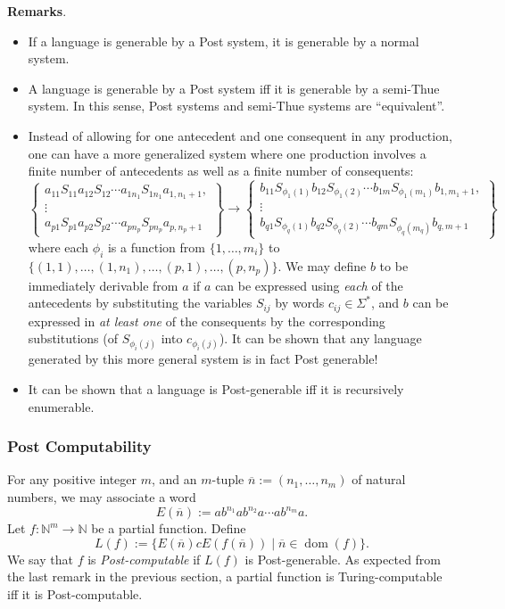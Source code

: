 \documentclass[12pt]{article}
\begin{document}
\textbf{Remarks}.
\begin{itemize}
\item If a language is generable by a Post system, it is generable by a normal system.
\item A language is generable by a Post system iff it is generable by a semi-Thue system.  In this sense, Post systems and semi-Thue systems are ``equivalent''.
\item Instead of allowing for one antecedent and one consequent in any production, one can have a more generalized system where one production involves a finite number of antecedents as well as a finite number of consequents: 
\begin{displaymath}
\left\{ \begin{array}{c}
a_{11}S_{11}a_{12}S_{12}\cdots a_{1n_1}S_{1n_1}a_{1,n_1+1}, \\ \vdots \\ 
a_{p1}S_{p1}a_{p2}S_{p2}\cdots a_{pn_p}S_{pn_p}a_{p,n_p+1} \end{array} \right\} 
\to 
\left\{ \begin{array}{c}
b_{11}S_{\phi_1(1)}b_{12}S_{\phi_1(2)}\cdots b_{1m}S_{\phi_1(m_1)}b_{1,m_1+1}, \\ \vdots \\ 
b_{q1}S_{\phi_q(1)}b_{q2}S_{\phi_q(2)}\cdots b_{qm}S_{\phi_q(m_q)}b_{q,m+1} \end{array} \right\}
\end{displaymath}
where each $\phi_i$ is a function from $\lbrace 1,\ldots,m_i\rbrace$ to $\lbrace (1,1),\ldots,(1,n_1),\ldots, (p,1),\ldots, (p,n_p)\rbrace$.  We may define $b$ to be immediately derivable from $a$ if $a$ can be expressed using  \emph{each} of the antecedents by substituting the variables $S_{ij}$ by words $c_{ij}\in \Sigma^*$, and $b$ can be expressed in \emph{at least one} of the consequents by the corresponding substitutions (of $S_{\phi_i(j)}$ into $c_{\phi_i(j)}$).  It can be shown that any language generated by this more general system is in fact Post generable!
\item It can be shown that a language is Post-generable iff it is recursively enumerable.
\end{itemize}

\subsubsection*{Post Computability}  

For any positive integer $m$, and an $m$-tuple $\overline{n}:=(n_1,\ldots,n_m)$ of natural numbers, we may associate a word $$E(\overline{n}):=ab^{n_1}ab^{n_2}a\cdots ab^{n_m}a.$$
Let $f:\mathbb{N}^m \to \mathbb{N}$ be a partial function.  Define 
$$L(f):=\lbrace E(\overline{n})cE(f(\overline{n})) \mid \overline{n}\in \operatorname{dom}(f)\rbrace.$$
We say that $f$ is \emph{Post-computable} if $L(f)$ is Post-generable.  As expected from the last remark in the previous section, a partial function is Turing-computable iff it is Post-computable.
\end{document}
